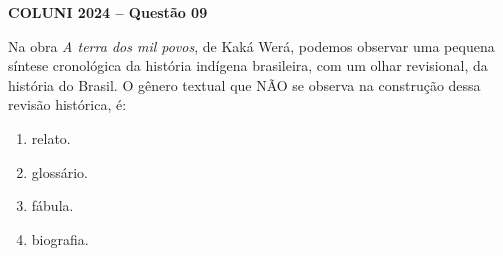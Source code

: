 \textbf{COLUNI 2024 -- Questão 09}\par\medskip Na obra \textit{A terra dos mil povos}, de Kaká Werá, podemos observar uma pequena síntese cronológica da história indígena brasileira, com um olhar revisional, da história do Brasil. O gênero textual que NÃO se observa na construção dessa revisão histórica, é:

\begin{enumerate}
\item relato.
\item glossário.
\item fábula.
\item biografia.
\end{enumerate}
